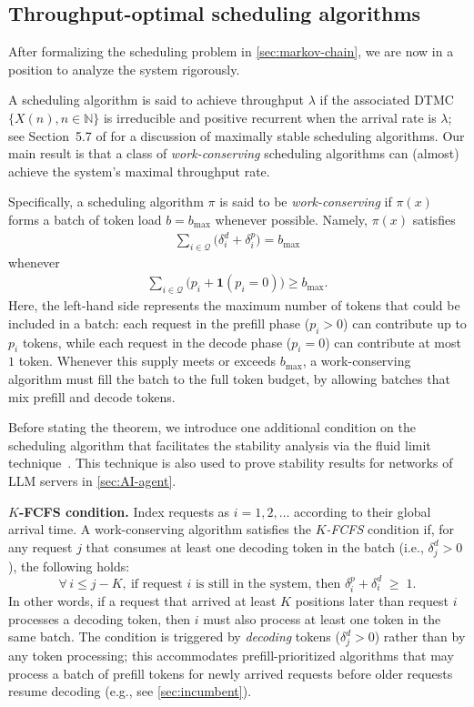 \documentclass[11pt]{article}
\theoremstyle{plain}
\theoremstyle{definition}
\theoremstyle{remark}
\begin{document}
\subsection{Throughput-optimal scheduling algorithms}


After formalizing the scheduling problem in \cref{sec:markov-chain}, we are now in a position to analyze the system rigorously. 

A scheduling algorithm is said to achieve throughput $\lambda$ if the associated DTMC $\{X(n), n \in \mathbb{N}\}$ is irreducible and positive recurrent when the arrival rate is $\lambda$; see Section~5.7 of \citep{dai2020processing} for a discussion of maximally stable scheduling algorithms. Our main result is that a class of \emph{work-conserving} scheduling algorithms can (almost) achieve the system’s maximal throughput rate.


Specifically, a scheduling algorithm $\pi$ is said to be \textit{work-conserving} if $\pi(x)$ forms a batch of token load $b = b_{\max}$ whenever possible. Namely, $\pi(x)$ satisfies
\begin{align}
\sum_{i\in \mathcal{Q}}\Big( \delta_{i}^{d} + \delta_{i}^{p}\Big) = b_{\max} 
\end{align}
whenever
\begin{align}
\sum_{i\in \mathcal{Q}} \Big( p_{i} +  \boldsymbol{1}(p_{i} =0)\Big)  \ge b_{\max}.
\end{align}
Here, the left-hand side represents the maximum number of tokens that could be included in a batch: each request in the prefill phase ($p_i > 0$) can contribute up to $p_i$ tokens, while each request in the decode phase ($p_i = 0$) can contribute at most $1$ token. Whenever this supply meets or exceeds $b_{\max}$, a work-conserving algorithm must fill the batch to the full token budget, by allowing batches that mix prefill and decode tokens.

Before stating the theorem, we introduce one additional condition on the scheduling algorithm that facilitates the stability analysis via the fluid limit technique~\citep{dai1995positive,stolyar1995stability,dai2020processing}. This technique is also used to prove stability results for networks of LLM servers in \cref{sec:AI-agent}.

\noindent \textbf{$K$-FCFS condition.}
Index requests as $i = 1, 2, \dotsc$ according to their global arrival time. A work-conserving algorithm satisfies the \emph{$K$-FCFS} condition if,
for any request $j$ that consumes at least one decoding token in the batch
(i.e., $\delta_{j}^d > 0$), the following holds:
\[
\forall\, i \le j-K,~\text{if request $i$ is still in the system, then }
\delta_{i}^p + \delta_{i}^d \;\ge\; 1.
\]
In other words, if a request that arrived at least $K$ positions later than request $i$ processes a decoding token, then $i$ must also process at least one token in the same batch. The condition is triggered by \emph{decoding} tokens ($\delta_j^d > 0$) rather than by any token processing; this accommodates prefill-prioritized algorithms that may process a batch of prefill tokens for newly arrived requests before older requests resume decoding (e.g., see \cref{sec:incumbent}). 
\end{document}
